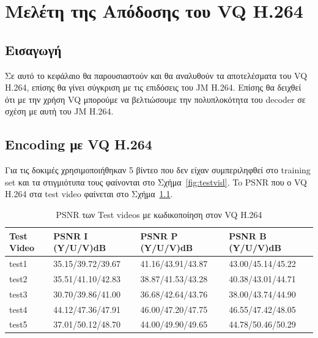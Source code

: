 ﻿\chapter{Μελέτη της Απόδοσης του VQ H.264}
\label{chapter:chap6}

\section{Εισαγωγή}
\label{section:sect61}

\indent Σε αυτό το κεφάλαιο θα παρουσιαστούν και θα αναλυθούν τα αποτελέσματα του VQ H.264, επίσης θα γίνει σύγκριση με τις επιδόσεις του JM H.264. Επίσης θα δειχθεί ότι με την χρήση VQ μπορούμε να βελτιώσουμε την πολυπλοκότητα του decoder σε σχέση με αυτή του JM H.264.

\section{Encoding με VQ H.264}
\label{section:sect62}

\indent Για τις δοκιμές χρησιμοποιήθηκαν 5 βίντεο που δεν είχαν συμπεριληφθεί στο training set και τα στιγμιότυπα τους φαίνονται στο Σχήμα~\ref{fig:testvid}. To PSNR που ο VQ H.264 στα test video φαίνεται στο Σχήμα~\ref{table:testpsnr}.

\begin{table}[h!]
    \begin{center}
        \begin{tabular}{| l | l | l | l |}
        \hline
        Test Video & PSNR I (Y/U/V)dB  & PSNR P (Y/U/V)dB  & PSNR B (Y/U/V)dB       \\ \hline
        test1      & 35.15/39.72/39.67 & 41.16/43.91/43.87 & 43.00/45.14/45.22      \\ \hline
        test2      & 35.51/41.10/42.83 & 38.87/41.53/43.28 & 40.38/43.01/44.71      \\ \hline
        test3      & 30.70/39.86/41.00 & 36.68/42.64/43.76 & 38.00/43.74/44.90      \\ \hline
        test4      & 44.12/47.36/47.91 & 46.00/47.20/47.75 & 46.55/47.42/48.05      \\ \hline
        test5      & 37.01/50.12/48.70 & 44.00/49.90/49.65 & 44.78/50.46/50.29      \\ \hline
        \hline
        \end{tabular}
    \end{center}

    \caption{PSNR των Test videos με κωδικοποίηση στον VQ H.264}
    \label{table:testpsnr}
\end{table}

